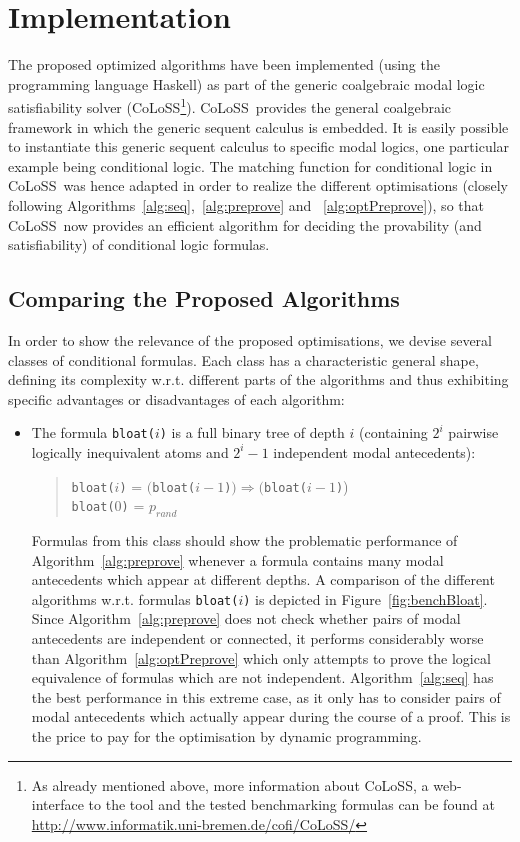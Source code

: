 \documentclass{entcs} \usepackage{entcsmacro}
\newcommand{\COLOSS}{{\textrm CoLoSS}}
\begin{document}
\section{Implementation}

The proposed optimized algorithms have been implemented (using the programming
language Haskell) as part of the generic coalgebraic modal logic satisfiability
solver (\COLOSS\footnote{As already mentioned above, more information about \COLOSS,
a web-interface to the tool and 
the tested benchmarking formulas can be found at \url{http://www.informatik.uni-bremen.de/cofi/CoLoSS/}}).
\COLOSS~provides the general coalgebraic framework in which the generic
sequent calculus is embedded. It is easily possible to instantiate this generic sequent
calculus to specific modal logics, one particular example being conditional logic.
The matching function for conditional logic in \COLOSS~was hence adapted in order to realize
the different optimisations (closely following Algorithms~\ref{alg:seq},~\ref{alg:preprove} and
~\ref{alg:optPreprove}), so that \COLOSS~now provides an efficient algorithm for
deciding the provability (and satisfiability) of conditional logic formulas.

\subsection{Comparing the Proposed Algorithms}
\label{sec:bench}

In order to show the relevance of the proposed optimisations, we devise several classes
of conditional formulas. Each class has a characteristic general shape, defining its
complexity w.r.t. different parts of the algorithms and thus exhibiting specific
advantages or disadvantages of each algorithm:

\begin{itemize}
\item The formula \verb|bloat(|$i$\verb|)| is a full binary tree of depth $i$ (containing $2^i$ pairwise logically
inequivalent atoms and $2^i-1$ independent modal antecedents):
\begin{quote}
\verb|bloat(|$i$\verb|)| = $($\verb|bloat(|$i-1$\verb|)|$)\Rightarrow($\verb|bloat(|$i-1$\verb|)|)\\
\verb|bloat(|$0$\verb|)| = $p_{rand}$
\end{quote}
Formulas from this class should show the problematic performance of Algorithm~\ref{alg:preprove} whenever
a formula contains many modal antecedents which appear at different depths. A comparison of the different
algorithms w.r.t. formulas \verb|bloat(|$i$\verb|)| is depicted in Figure~\ref{fig:benchBloat}.
Since Algorithm~\ref{alg:preprove} does not check whether pairs of modal antecedents are independent or connected,
it performs considerably worse than Algorithm~\ref{alg:optPreprove} which only attempts to prove the logical
equivalence of formulas which are not independent. Algorithm~\ref{alg:seq} has the best performance in this
extreme case, as it only has to consider pairs of modal antecedents which actually appear during the course
of a proof. This is the price to pay for the optimisation by dynamic programming.
\end{itemize}
\end{document}
